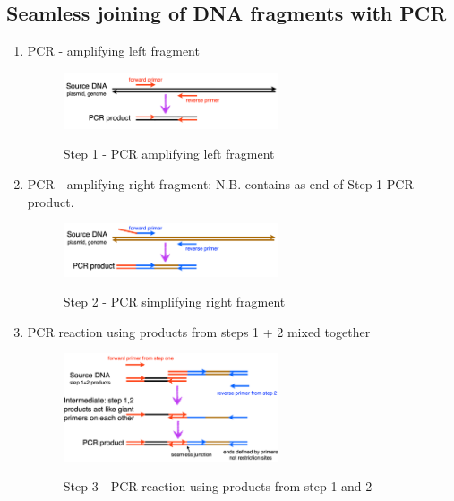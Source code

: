\subsection{Seamless joining of DNA fragments with PCR}
\begin{enumerate}
    \item PCR - amplifying left fragment
    \begin{figure}[h]
    \centering
    \includegraphics[width=0.6\textwidth]{images/4-3-1.png}\\[.2in]
    \caption{Step 1 - PCR amplifying left fragment}
    \label{dCas9}
    \end{figure}
    \item PCR - amplifying right fragment: N.B.  contains  as end of Step 1 PCR product.
    \begin{figure}[h]
    \centering
    \includegraphics[width=0.6\textwidth]{images/4-3-2.png}\\[.2in]
    \caption{Step 2 - PCR simplifying right fragment}
    \label{dCas9}
    \end{figure}
    \item PCR reaction using products from steps 1 + 2 mixed together
    \begin{figure}[h]
    \centering
    \includegraphics[width=0.6\textwidth]{images/4-3-3.png}\\[.2in]
    \caption{Step 3 - PCR reaction using products from step 1 and 2}
    \label{dCas9}
    \end{figure}
\end{enumerate}
